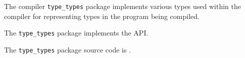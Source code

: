 
The compiler {\tt type\_types} package implements various types used within 
the compiler for representing types in the program being compiled.

The {\tt type\_types} package implements the  API.

The {\tt type\_types} package source code is .



